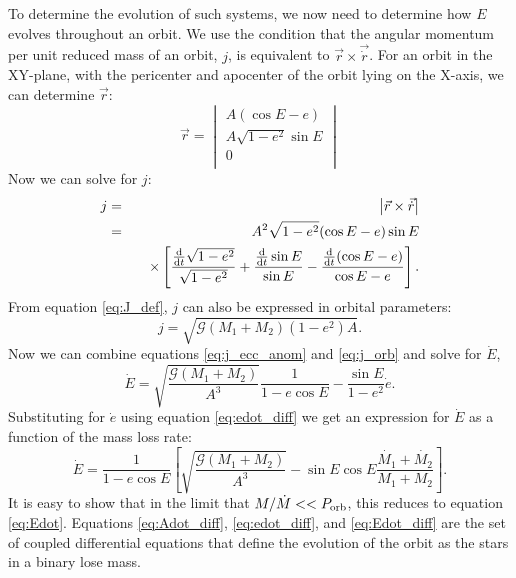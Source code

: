 \documentclass{emulateapj}
\begin{document}
To determine the evolution of such systems, we now need to determine how $E$ evolves throughout an orbit. We use the condition that the angular momentum per unit reduced mass of an orbit, $j$, is equivalent to $\vec{r} \times \vec{\dot{r}}$. For an orbit in the XY-plane, with the pericenter and apocenter of the orbit lying on the X-axis, we can determine $\vec{r}$:
\begin{equation}
\vec{r} =
  \begin{vmatrix}
    A (\cos E - e ) \\
    A \sqrt{1-e^2} \sin E \\
    0 \\        
  \end{vmatrix} 
\end{equation}
Now we can solve for $j$:
\begin{eqnarray}
j &=& \begin{vmatrix} \vec{r} \times \vec{\dot{r}} \end{vmatrix} \nonumber \\
 &=& A^2 \sqrt{1-e^2} (\cos E - e) \sin E \nonumber \\
 &\qquad& \times \left[ \frac{\frac{\rm d}{{\rm d}t} \sqrt{1-e^2}}{\sqrt{1-e^2}} + \frac{\frac{\rm d}{{\rm d}t}\sin E }{\sin E} - \frac{\frac{\rm d}{{\rm d}t}(\cos E - e)}{\cos E - e} \right]. \label{eq:j_ecc_anom}
\end{eqnarray}
From equation \ref{eq:J_def}, $j$ can also be expressed in orbital parameters:
\begin{equation}
j = \sqrt{\mathcal{G} (M_1 + M_2) (1-e^2) A}. \label{eq:j_orb}
\end{equation}
Now we can combine equations \ref{eq:j_ecc_anom} and \ref{eq:j_orb} and solve for $\dot{E}$, 
\begin{equation}
\dot{E} = \sqrt{\frac{\mathcal{G} (M_1 + M_2)}{A^3}} \frac{1}{1 - e \cos E} - \frac{\sin E}{1 - e^2} \dot{e}. \label{eq:E_dot}
\end{equation}
Substituting for $\dot{e}$ using equation \ref{eq:edot_diff} we get an expression for $\dot{E}$ as a function of the mass loss rate:
\begin{equation}
\dot{E} = \frac{1}{1-e \cos E} \left[ \sqrt{\frac{\mathcal{G} (M_1 + M_2)}{A^3}} - \sin E \cos E \frac{\dot{M_1} + \dot{M_2}}{M_1 + M_2} \right]. \label{eq:Edot_diff}
\end{equation} 
It is easy to show that in the limit that $M/\dot{M} << P_{\rm orb}$, this reduces to equation \ref{eq:Edot}. Equations \ref{eq:Adot_diff}, \ref{eq:edot_diff}, and \ref{eq:Edot_diff} are the set of coupled differential equations that define the evolution of the orbit as the stars in a binary lose mass. 
\end{document}
